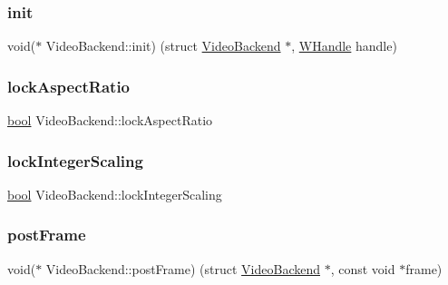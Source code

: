 \subsubsection{\texorpdfstring{init}{init}}
{\footnotesize\ttfamily void($\ast$ Video\+Backend\+::init) (struct \mbox{\hyperlink{struct_video_backend}{Video\+Backend}} $\ast$, \mbox{\hyperlink{video-backend_8h_aaa69bc83f36b455578d1f29b125741d9}{W\+Handle}} handle)}

\mbox{\label{struct_video_backend_abf7b35416a021f9bfeb989f1efe74a34}} 
\subsubsection{\texorpdfstring{lock\+Aspect\+Ratio}{lockAspectRatio}}
{\footnotesize\ttfamily \mbox{\hyperlink{libretro_8h_a4a26dcae73fb7e1528214a068aca317e}{bool}} Video\+Backend\+::lock\+Aspect\+Ratio}

\mbox{\label{struct_video_backend_aaa4f6337d11f985b14444652280650de}} 
\subsubsection{\texorpdfstring{lock\+Integer\+Scaling}{lockIntegerScaling}}
{\footnotesize\ttfamily \mbox{\hyperlink{libretro_8h_a4a26dcae73fb7e1528214a068aca317e}{bool}} Video\+Backend\+::lock\+Integer\+Scaling}

\mbox{\label{struct_video_backend_a59a0ef3e8be90142a3382107dfa72c66}} 
\subsubsection{\texorpdfstring{post\+Frame}{postFrame}}
{\footnotesize\ttfamily void($\ast$ Video\+Backend\+::post\+Frame) (struct \mbox{\hyperlink{struct_video_backend}{Video\+Backend}} $\ast$, const void $\ast$frame)}

\mbox{\label{struct_video_backend_af5a54ad07696f911edeb912994994938}} 
